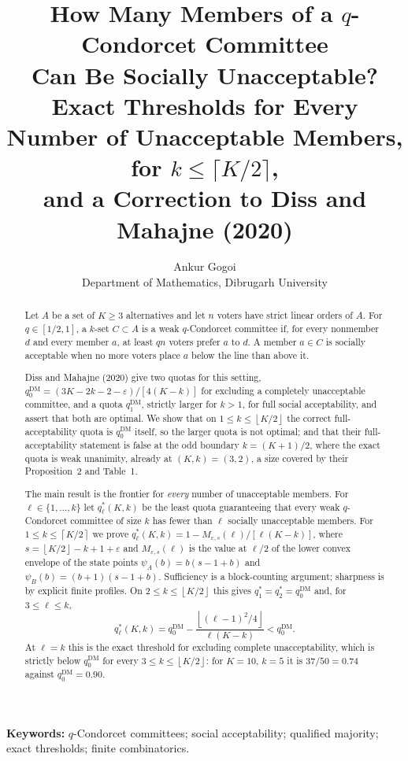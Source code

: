\documentclass[11pt]{article}
\theoremstyle{plain}
\theoremstyle{definition}
\newcommand{\cl}[1]{\left\lceil #1\right\rceil}
\newcommand{\fl}[1]{\left\lfloor #1\right\rfloor}
\newcommand{\eps}{\varepsilon}
\newcommand{\DM}{\mathrm{DM}}
\begin{document}
\title{How Many Members of a $q$-Condorcet Committee\\ Can Be Socially Unacceptable?\\[4pt]
\large Exact Thresholds for Every Number of Unacceptable Members, for $k\le\lceil K/2\rceil$,\\ and a Correction to Diss and Mahajne (2020)}
\author{Ankur Gogoi\\ \small Department of Mathematics, Dibrugarh University}
\date{}
\maketitle

\begin{abstract}
Let $A$ be a set of $K\ge3$ alternatives and let $n$ voters have strict linear orders of $A$. For $q\in[1/2,1]$, a $k$-set $C\subset A$ is a weak $q$-Condorcet committee if, for every nonmember $d$ and every member $a$, at least $qn$ voters prefer $a$ to $d$. A member $a\in C$ is socially acceptable when no more voters place $a$ below the line than above it.

Diss and Mahajne (2020) give two quotas for this setting, $q_0^{\DM}=(3K-2k-2-\eps)/[4(K-k)]$ for excluding a completely unacceptable committee, and a quota $q_1^{\DM}$, strictly larger for $k>1$, for full social acceptability, and assert that both are optimal. We show that on $1\le k\le\fl{K/2}$ the correct full-acceptability quota is $q_0^{\DM}$ itself, so the larger quota is not optimal; and that their full-acceptability statement is false at the odd boundary $k=(K+1)/2$, where the exact quota is weak unanimity, already at $(K,k)=(3,2)$, a size covered by their Proposition~2 and Table~1.

The main result is the frontier for \emph{every} number of unacceptable members. For $\ell\in\{1,\dots,k\}$ let $q_\ell^*(K,k)$ be the least quota guaranteeing that every weak $q$-Condorcet committee of size $k$ has fewer than $\ell$ socially unacceptable members. For $1\le k\le\cl{K/2}$ we prove $q_\ell^*(K,k)=1-M_{\eps,s}(\ell)/[\ell(K-k)]$, where $s=\fl{K/2}-k+1+\eps$ and $M_{\eps,s}(\ell)$ is the value at $\ell/2$ of the lower convex envelope of the state points $\psi_A(b)=b(s-1+b)$ and $\psi_B(b)=(b+1)(s-1+b)$. Sufficiency is a block-counting argument; sharpness is by explicit finite profiles. On $2\le k\le\fl{K/2}$ this gives $q_1^*=q_2^*=q_0^{\DM}$ and, for $3\le\ell\le k$,
\[
q_\ell^*(K,k)=q_0^{\DM}-\frac{\fl{(\ell-1)^2/4}}{\ell(K-k)}<q_0^{\DM}.
\]
At $\ell=k$ this is the exact threshold for excluding complete unacceptability, which is strictly below $q_0^{\DM}$ for every $3\le k\le\fl{K/2}$: for $K=10$, $k=5$ it is $37/50=0.74$ against $q_0^{\DM}=0.90$.
\end{abstract}
\noindent\textbf{Keywords:} $q$-Condorcet committees; social acceptability; qualified majority; exact thresholds; finite combinatorics.
\end{document}
